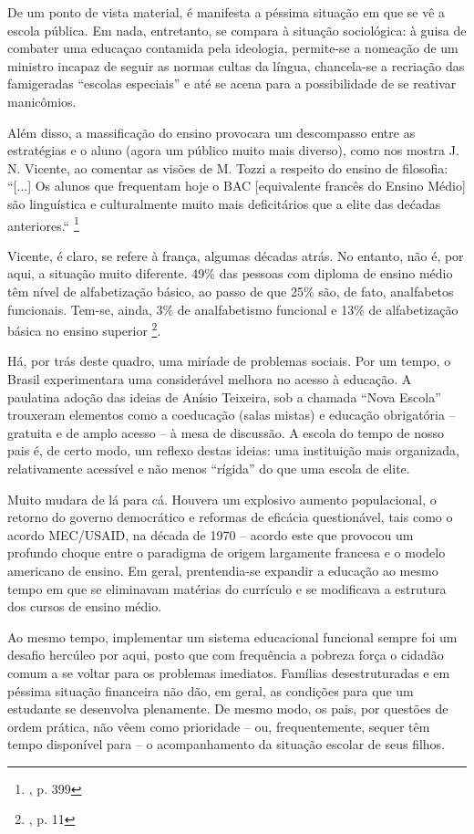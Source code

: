 \documentclass[12pt,a4paper]{article}
\begin{document}
	De um ponto de vista material, é manifesta a péssima situação em 
	que se vê a escola pública. Em nada, entretanto, se compara à 
	situação sociológica: à guisa de combater uma educaçao contamida 
	pela ideologia, permite-se a nomeação de um ministro incapaz de 
	seguir as normas cultas da língua, chancela-se a recriação das 
	famigeradas “escolas especiais” e até se acena para a 
	possibilidade de se reativar manicômios. 

	Além disso, a massificação do ensino provocara um descompasso entre 
	as estratégias e o aluno (agora um público muito mais diverso), como 
	nos mostra J. N. Vicente, ao comentar as visões de M. Tozzi a respeito 
	do ensino de filosofia: 
		“[...] Os alunos que frequentam hoje o BAC [equivalente francês 
		do Ensino Médio] são linguística e culturalmente muito mais 
		deficitários que a elite das dećadas anteriores.“
		\footnote{\cite{neves}, p. 399}
	
	Vicente, é claro, se refere à frança, algumas décadas atrás. No 
	entanto, não é, por aqui, a situação muito diferente. 49\% das 
	pessoas com diploma de ensino médio têm nível de alfabetização 
	básico, ao passo de que 25\% são, de fato, analfabetos funcionais. 
	Tem-se, ainda, 3\% de analfabetismo funcional e 13\% de 
	alfabetização básica no ensino superior
	\footnote{\cite{inaf2018}, p. 11}.

	Há, por trás deste quadro, uma miríade de problemas sociais. 
	Por um tempo, o Brasil experimentara uma considerável melhora no 
	acesso à educação. A paulatina adoção das ideias de Anísio Teixeira, 
	sob a chamada “Nova Escola” trouxeram elementos como a coeducação 
	(salas mistas) e educação obrigatória -- gratuita e de amplo acesso --
	à mesa de discussão. A escola do tempo de nosso pais é, de certo modo, 
	um reflexo destas ideias: uma instituição mais organizada, 
	relativamente acessível e não menos “rígida” do que uma escola de 
	elite. 

	Muito mudara de lá para cá. Houvera um explosivo aumento populacional, 
	o retorno do governo democrático e reformas de eficácia questionável, 
	tais como o acordo MEC/USAID, na década de 1970 -- acordo este que 
	provocou um profundo choque entre o paradigma de origem largamente 
	francesa e o modelo americano de ensino. Em geral, prentendia-se 
	expandir a educação ao mesmo tempo em que se eliminavam matérias 
	do currículo e se modificava a estrutura dos cursos de ensino médio. 

	Ao mesmo tempo, implementar um sistema educacional funcional sempre 
	foi um desafio hercúleo por aqui, posto que com frequência a pobreza 
	força o cidadão comum a se voltar para os problemas imediatos. 
	Famílias desestruturadas e em péssima situação financeira não dão, 
	em geral, as condições para que um estudante se desenvolva plenamente. 
	De mesmo modo, os pais, por questões de ordem prática, não vêem como 
	prioridade -- ou, frequentemente, sequer têm tempo disponível para -- 
	o acompanhamento da situação escolar de seus filhos. 
\end{document}
